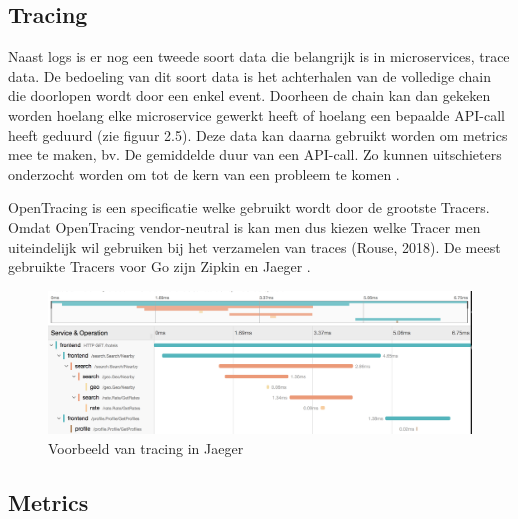\subsection{Tracing}

Naast logs is er nog een tweede soort data die belangrijk is in microservices, trace data. De bedoeling van dit soort data is het achterhalen van de volledige chain die doorlopen wordt door een enkel event. Doorheen de chain kan dan gekeken worden hoelang elke microservice gewerkt heeft of hoelang een bepaalde API-call heeft geduurd (zie figuur 2.5). Deze data kan daarna gebruikt worden om metrics mee te maken, bv. De gemiddelde duur van een API-call. Zo kunnen uitschieters onderzocht worden om tot de kern van een probleem te komen \autocite{Rouse2018}.

OpenTracing is een specificatie welke gebruikt wordt door de grootste Tracers. Omdat OpenTracing vendor-neutral is kan men dus kiezen welke Tracer men uiteindelijk wil gebruiken bij het verzamelen van traces (Rouse, 2018). De meest gebruikte Tracers voor Go zijn Zipkin en Jaeger \autocite{Sabic2018}.

\begin{figure}[ht]
    \includegraphics[scale=0.4]{img/tracing_voorbeeld}
    \caption[Voorbeeld van tracing in Jaeger]{Voorbeeld van tracing in Jaeger \cite{harlow2015}}
\end{figure}

\subsection{Metrics}

